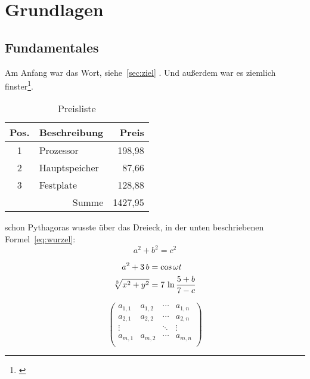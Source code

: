 

\section{Grundlagen}

\subsection{Fundamentales}
Am Anfang war das Wort, siehe~\ref{sec:ziel}%
. Und außerdem war es ziemlich finster\footnote{\cite{Mitt95:Latex}}.


\begin{table}[htb]
\caption{Preisliste}
\label{tab:preis}
\begin{center}
\begin{tabular}{c|l|r} %
Pos. & Beschreibung & Preis \\
\hline 			%
1 & Prozessor & 198,98 \\
2 & Hauptspeicher & 87,66 \\
3 & Festplate & 128,88 \\
\hline
\multicolumn{2}{r}{Summe} & 1427,95 \\
\hline
\end{tabular}
\end{center}
\end{table}


schon Pythagoras \cite[S. 48ff]{Mitt95:Latex} wusste über das Dreieck, in der unten beschriebenen Formel~\ref{eq:wurzel}:
\begin{equation*}
a^2 + b^2 = c^2
\end{equation*}

\begin{align}
a^2 + 3\,b &=\cos \omega t \notag \\
\sqrt[3]{x^2 + y^2} &=7\,\ln \dfrac{5 + b}{7 - c} \label{eq:wurzel}
\end{align}


\begin{equation}
\left(
\begin{array}{cccc}
a_{1,1} & a_{1,2} & \cdots & a_{1,n} \\
a_{2,1} & a_{2,2} & \cdots & a_{2,n} \\
	\vdots & & \ddots & \vdots \\
a_{m,1} & a_{m,2} & \cdots & a_{m,n} \\
\end{array}
\right)
\end{equation}

